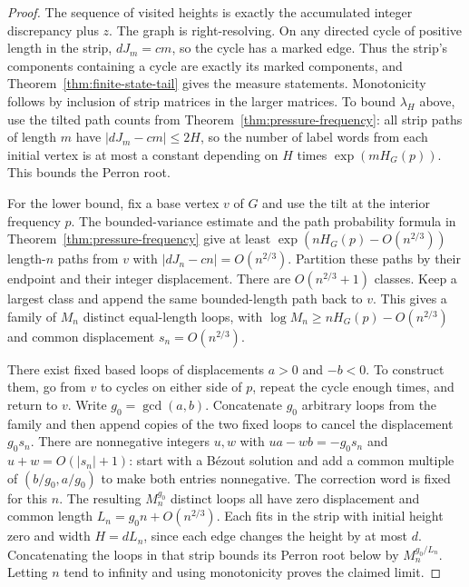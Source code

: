 \documentclass[11pt]{article}
\theoremstyle{definition}
\theoremstyle{remark}
\begin{document}
\begin{proof}
The sequence of visited heights is exactly the accumulated
integer discrepancy plus $z$. The graph is right-resolving.
On any directed cycle of positive length in the strip,
$dJ_m=cm$, so the cycle has a marked edge. Thus the strip's
components containing a cycle are exactly its marked components,
and Theorem~\ref{thm:finite-state-tail} gives the measure statements.
Monotonicity follows by inclusion of strip matrices in the larger
matrices. To bound $\lambda_H$ above, use the tilted path counts
from Theorem~\ref{thm:pressure-frequency}: all strip paths of length
$m$ have $|dJ_m-cm|\le2H$, so the number of label words from each
initial vertex is at most a constant depending on $H$ times
$\exp(mH_G(p))$. This bounds the Perron root.

For the lower bound, fix a base vertex $v$ of $G$ and use the
tilt at the interior frequency $p$. The bounded-variance estimate
and the path probability formula in
Theorem~\ref{thm:pressure-frequency} give at least
$\exp(nH_G(p)-O(n^{2/3}))$ length-$n$ paths from $v$ with
$|dJ_n-cn|=O(n^{2/3})$.
Partition these paths by their endpoint and their integer displacement.
There are $O(n^{2/3}+1)$ classes. Keep a largest class and append
the same bounded-length path back to $v$. This gives a family of
$M_n$ distinct equal-length loops, with
$\log M_n\ge nH_G(p)-O(n^{2/3})$ and common displacement $s_n=O(n^{2/3})$.

There exist fixed based loops of displacements $a>0$ and $-b<0$.
To construct them, go from $v$ to cycles on either side of $p$,
repeat the cycle enough times, and return to $v$.
Write $g_0=\gcd(a,b)$. Concatenate $g_0$ arbitrary loops from the
family and then append copies of the two fixed loops to cancel
the displacement $g_0s_n$. There are nonnegative integers $u,w$ with
$ua-wb=-g_0s_n$ and $u+w=O(|s_n|+1)$: start with a B\'ezout
solution and add a common multiple of $(b/g_0,a/g_0)$ to
make both entries nonnegative. The correction word is fixed
for this $n$. The resulting $M_n^{g_0}$ distinct loops all have
zero displacement and common length $L_n=g_0n+O(n^{2/3})$.
Each fits in the strip with initial height zero and width
$H=dL_n$, since each edge changes the height by at most $d$.
Concatenating the loops in that strip bounds its Perron root
below by $M_n^{g_0/L_n}$. Letting $n$ tend to infinity and using
monotonicity proves the claimed limit.
\end{proof}
\end{document}
